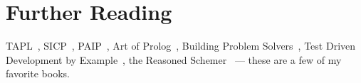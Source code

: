 \begin{comment}
A case class provides a few helpers in the companion object. Here is
how the desugaring works.
\begin{lstlisting}[language=Scala]
case class Foo(a: Int)
// produces companion object
object Foo {
  def apply(a: Int): Foo = Foo(a)
  def unapply(x: Foo): Some[Int] = Some(x.a)
}
\end{lstlisting}

For more, see \url{https://github.com/namin/metaprogramming/blob/master/lectures/0-scala-intro/intro_done.scala}
\end{comment}

\section{Further Reading}

\begin{comment}
We will be using the Scala programming language for assignments. There
are many books that could be useful but none are required. I recommend
\cite{scala-by-example} as well as the book by
\cite{scala-book-by-odersky}.
\end{comment}

TAPL~\citep{tapl}, SICP~\citep{sicp}, PAIP~\citep{paip}, Art of Prolog~\citep{art-prolog},
Building Problem Solvers~\citep{bps},
Test Driven Development by Example~\citep{tdd},
the Reasoned Schemer~\citep{mk2005,mk} --- these are a few of my favorite books.
